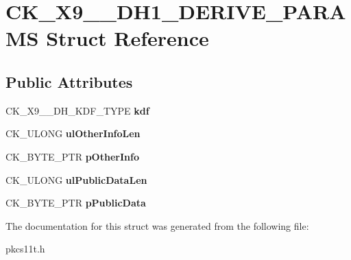 \hypertarget{struct_c_k___x9__42___d_h1___d_e_r_i_v_e___p_a_r_a_m_s}{}\section{C\+K\+\_\+\+X9\+\_\+\_\+\+D\+H1\+\_\+\+D\+E\+R\+I\+V\+E\+\_\+\+P\+A\+R\+A\+MS Struct Reference}
\label{struct_c_k___x9__42___d_h1___d_e_r_i_v_e___p_a_r_a_m_s}
\subsection*{Public Attributes}
\begin{DoxyCompactItemize}
\item 
\mbox{\label{struct_c_k___x9__42___d_h1___d_e_r_i_v_e___p_a_r_a_m_s_ac146ca5909e4014a93a594a28e1ed1aa}} 
C\+K\+\_\+\+X9\+\_\+\_\+\+D\+H\+\_\+\+K\+D\+F\+\_\+\+T\+Y\+PE {\bfseries kdf}
\item 
\mbox{\label{struct_c_k___x9__42___d_h1___d_e_r_i_v_e___p_a_r_a_m_s_ae1fbe145c010d0da95b6dcbbbbde66b2}} 
C\+K\+\_\+\+U\+L\+O\+NG {\bfseries ul\+Other\+Info\+Len}
\item 
\mbox{\label{struct_c_k___x9__42___d_h1___d_e_r_i_v_e___p_a_r_a_m_s_a04a9225bf31fab76357710bd5db02867}} 
C\+K\+\_\+\+B\+Y\+T\+E\+\_\+\+P\+TR {\bfseries p\+Other\+Info}
\item 
\mbox{\label{struct_c_k___x9__42___d_h1___d_e_r_i_v_e___p_a_r_a_m_s_a018761bbb49073be69643c0611a18a0b}} 
C\+K\+\_\+\+U\+L\+O\+NG {\bfseries ul\+Public\+Data\+Len}
\item 
\mbox{\label{struct_c_k___x9__42___d_h1___d_e_r_i_v_e___p_a_r_a_m_s_afbd09648c23c237f640bbef4d9151161}} 
C\+K\+\_\+\+B\+Y\+T\+E\+\_\+\+P\+TR {\bfseries p\+Public\+Data}
\end{DoxyCompactItemize}


The documentation for this struct was generated from the following file\+:\begin{DoxyCompactItemize}
\item 
pkcs11t.\+h\end{DoxyCompactItemize}
